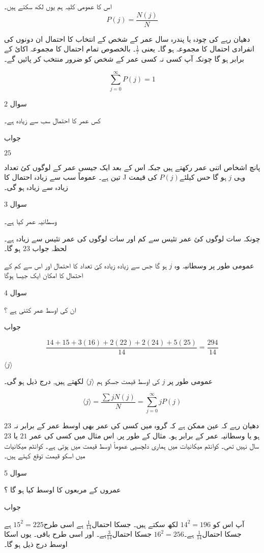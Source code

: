 اس کا عمومی کلیہ ہم یوں لکھ سکتے ہیں۔ 
\[P(j) = \frac{N(j)}{N} \]

دھیان رہے کی چودہ یا پندرہ سال عمر کے شخص کے انتخاب کا احتمال ان دونوں کی انفرادی احتمال کا مجموعہ ہو گا۔ یعنی \( \frac{1}{7} \)۔
بالخصوص تمام احتمال کا مجموعہ اکائ کے برابر ہو گا چونکہ آپ کسی نہ کسی عمر کے شخص کو ضرور منتخب کر پائیں گے۔ 

\[ \sum_{j=0}^{\infty} P(j) = 1 \]

سوال 2

کس عمر کا احتمال سب سے زیادہ ہے۔

جواب 

\( 25 \)

پانچ اشخاص اتنی عمر رکھتے ہیں جبکہ اس کے بعد ایک جیسی عمر کے لوگوں کئ تعداد تین ہے۔ عموماً سب سے زیادہ احتمال کا J وہی \( j \) ہو گا حس کیلئے\( P(j) \) کی قیمت زیادہ سے زیادہ ہو گی۔ 


سوال 3

وسطانیہ عمر کیا ہے۔ 

چونکہ سات لوگوں کئ عمر تئیس سے کم اور سات لوگوں  کی  عمر تئیس سے زیادہ ہے۔ لحظہ جواب \( 23 \) ہو گا۔ 

عمومی طور پر وسطانیہ وہ \( j \) ہو گا جس سے زیادہ زیادہ کئ تعداد کا احتمال اور اس سے کم کے احتمال کا امکان ایک جیسا ہوگا 

سوال 4

ان  کی  اوسط عمر کتنی ہے ؟

جواب 

\[ \frac{14+15+3(16)+2(22)+2(24)+5(25)}{14} = \frac{294}{14} \]
 
\( \langle j \rangle \) 

عمومی طور پر \( j \) کی اوسط قیمت جسکو ہم  \( \langle j \rangle \) لکھتے ہیں, درج ذیل ہو گی۔ 

\[ \langle j \rangle = \frac{\sum  j N(j)}{N} = \sum_{j=0}^{\infty} jP(j)  \]

\( 23 \)
دھیان رہے کہ عین ممکن ہے کہ گروہ میں کسی کی عمر بھی اوسط عمر کے برابر نہ ہو یا وسطانیہ عمر کے برابر ہو۔ مثال کے طور پر,  اس مثال میں کسی کی عمر \( 21 \) یا \( 23 \) سال نہیں تھی۔ 
کوانٹم میکانیات میں ہماری دلچسپی عموماً اوسط قیمت میں ہوتی ہے۔ کوانٹم میکانیات میں اسکو قیمت توقع کہتے ہیں۔ 


سوال 5

عمروں کے مربعوں کا اوسط کیا ہو گا ؟

جواب

 
آپ اس کو \( 14^{2} = 196 \) لکھ سکتے ہیں۔ جسکا احتمال\( \frac{1}{14} \) ہے 
اسی طرح\( 15^{2} = 225 \) ہے جسکا احتمال\( \frac{1}{14} \) ہے۔\( 16^{2} = 256 \) جسکا احتمال\( \frac{3}{14} \)ہے۔ 
اور اسی طرح باقی۔ 
یوں اسکا اوسط درج ذیل ہو گا۔ 


